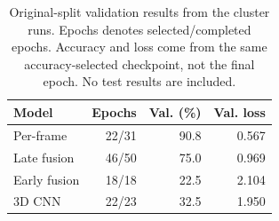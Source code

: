 \begin{table}[t]
    \centering
    \caption{Original-split validation results from the cluster runs.
    Epochs denotes selected/completed epochs. Accuracy and loss come
    from the same accuracy-selected checkpoint, not the final epoch.
    No test results are included.}
    \label{tab:baselines}
    \begin{tabular}{lrrr}
        \toprule
        Model & Epochs & Val. (\%) & Val. loss \\
        \midrule
        Per-frame & 22/31 & 90.8 & 0.567 \\
        Late fusion & 46/50 & 75.0 & 0.969 \\
        Early fusion & 18/18 & 22.5 & 2.104 \\
        3D CNN & 22/23 & 32.5 & 1.950 \\
        \bottomrule
    \end{tabular}
\end{table}
